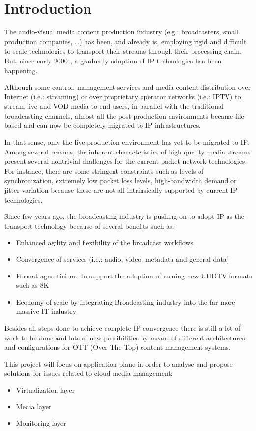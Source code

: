 \cleardoublepage
{}
\chapter*{Introduction}

The audio-visual media content production industry (e.g.: broadcasters, small production companies, \ldots) has been, and already is, employing rigid and difficult to scale technologies to transport their streams through their processing chain. But, since early 2000s, a gradually adoption of IP technologies has been happening.

Although some control, management services and media content distribution over Internet (i.e.: streaming) or over proprietary operator networks (i.e.: IPTV) to stream live and VOD media to end-users, in parallel with the traditional broadcasting channels, almost all the post-production environments became file-based and can now be completely migrated to IP infrastructures. 

In that sense, only the live production environment has yet to be migrated to IP. Among several reasons, the inherent characteristics of high quality media streams present several nontrivial challenges for the current packet network technologies. For instance, there are some stringent constraints such as levels of synchronization, extremely low packet loss levels, high-bandwidth demand or jitter variation because these are not all intrinsically supported by current IP technologies.

Since few years ago, the broadcasting industry is pushing on to adopt IP as the transport technology because of several benefits such as:

\begin{itemize}
  \item Enhanced agility and flexibility of the broadcast workflows
  \item Convergence of services (i.e.: audio, video, metadata and general data)
  \item Format agnosticism. To support the adoption of coming new UHDTV formats such as 8K 
  \item Economy of scale by integrating Broadcasting industry into the far more massive IT industry
\end{itemize}

Besides all steps done to achieve complete IP convergence there is still a lot of work to be done and lots of new possibilities by means of different architectures and configurations for OTT (Over-The-Top) content management systems. 

This project will focus on application plane in order to analyse and propose solutions for issues related to cloud media management:

 \begin{itemize}
  \item Virtualization layer \hfill \\
  \item Media layer \hfill \\
  \item Monitoring layer \hfill \\
\end{itemize}






